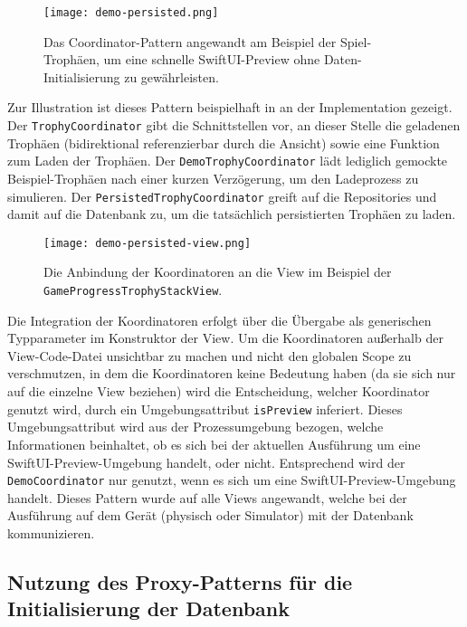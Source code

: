\begin{figure}[H]
\texttt{[image: demo-persisted.png]}
\caption{Das Coordinator-Pattern angewandt am Beispiel der Spiel-Trophäen, um eine schnelle SwiftUI-Preview ohne Daten-Initialisierung zu gewährleisten.}\label{fig:demo-persisted}
\end{figure}

\noindent Zur Illustration ist dieses Pattern beispielhaft in  an der Implementation gezeigt. Der \texttt{TrophyCoordinator} gibt die Schnittstellen vor, an dieser Stelle die geladenen Trophäen (bidirektional referenzierbar durch die Ansicht) sowie eine Funktion zum Laden der Trophäen. Der \texttt{DemoTrophyCoordinator} lädt lediglich gemockte Beispiel-Trophäen nach einer kurzen Verzögerung, um den Ladeprozess zu simulieren. Der \texttt{PersistedTrophyCoordinator} greift auf die Repositories und damit auf die Datenbank zu, um die tatsächlich persistierten Trophäen zu laden.

\begin{figure}[H]
\texttt{[image: demo-persisted-view.png]}
\caption{Die Anbindung der Koordinatoren an die View im Beispiel der \texttt{GameProgressTrophyStackView}.}\label{fig:demo-persisted-view}
\end{figure}

\noindent Die Integration der Koordinatoren erfolgt über die Übergabe als generischen Typparameter im Konstruktor der View. Um die Koordinatoren außerhalb der View-Code-Datei unsichtbar zu machen und nicht den globalen Scope zu verschmutzen, in dem die Koordinatoren keine Bedeutung haben (da sie sich nur auf die einzelne View beziehen) wird die Entscheidung, welcher Koordinator genutzt wird, durch ein Umgebungsattribut \texttt{isPreview} inferiert. Dieses Umgebungsattribut wird aus der Prozessumgebung bezogen, welche Informationen beinhaltet, ob es sich bei der aktuellen Ausführung um eine SwiftUI-Preview-Umgebung handelt, oder nicht. Entsprechend wird der \texttt{DemoCoordinator} nur genutzt, wenn es sich um eine SwiftUI-Preview-Umgebung handelt. Dieses Pattern wurde auf alle Views angewandt, welche bei der Ausführung auf dem Gerät (physisch oder Simulator) mit der Datenbank kommunizieren.

\subsection{Nutzung des Proxy-Patterns für die Initialisierung der Datenbank}

